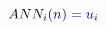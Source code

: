 \documentclass[12pt]{article}
\begin{document}
\makeatletter
\renewcommand*{\@textcolor}[3]{%
  \protect\leavevmode
  \begingroup
    \color#1{#2}#3%
  \endgroup
}
\makeatother
\begin{displaymath}
\mathcolor[RGB]{0,0,15}{A} \mathcolor[RGB]{0,0,30}{N} \mathcolor[RGB]{0,0,45}{N} _ { \mathcolor[RGB]{0,0,60}{i} } \mathcolor[RGB]{0,0,75}{(} \mathcolor[RGB]{0,0,90}{n} \mathcolor[RGB]{0,0,105}{)} \mathcolor[RGB]{0,0,120}{=} \mathcolor[RGB]{0,0,135}{u} _ { \mathcolor[RGB]{0,0,150}{i} }
\end{displaymath}
\end{document}
